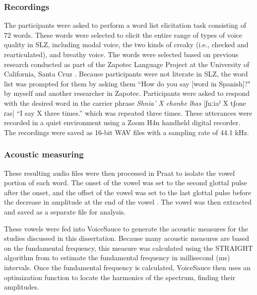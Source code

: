 \subsubsection{Recordings} \label{sec:recordings} 
The participants were asked to perform a word list elicitation task consisting of 72 words. These words were selected to elicit the entire range of types of voice quality in SLZ, including modal voice, the two kinds of creaky (i.e., checked and rearticulated), and breathy voice. The words were selected based on previous research conducted as part of the Zapotec Language Project at the University of California, Santa Cruz \citep{ZapotecLanguageProject}. 
Because participants were not literate in SLZ, the word list was prompted for them by asking them ``How do you say [word in Spanish]?" by myself and another researcher in Zapotec. Participants were asked to respond with the desired word in the carrier phrase \textit{Shnia' X chonhe lhas} [ʃnːiaˀ X tʃone ɾas] ``I say X three times.'' which was repeated three times. These utterances were recorded in a quiet environment using a Zoom H4n handheld digital recorder. The recordings were saved as 16-bit WAV files with a sampling rate of 44.1 kHz.

\subsubsection{Acoustic measuring} \label{sec:acoustics}

These resulting audio files were then processed in Praat to isolate the vowel portion of each word. The onset of the vowel was set to the second glottal pulse after the onset, and the offset of the vowel was set to the last glottal pulse before the decrease in amplitude at the end of the vowel \citep{garellekAcousticDiscriminabilityComplex2020}. The vowel was then extracted and saved as a separate file for analysis.

These vowels were fed into VoiceSauce \citep{shueVoiceSauceProgramVoice2011} to generate the acoustic measures for the studies discussed in this dissertation. Because many acoustic measures are based on the fundamental frequency, this measure was calculated using the STRAIGHT algorithm from \citep{kawaharaInstantaneousfrequencybasedPitchExtraction1998} to estimate the fundamental frequency in millisecond (ms) intervals. Once the fundamental frequency is calculated, VoiceSauce then uses an optimization function to locate the harmonics of the spectrum, finding their amplitudes.

